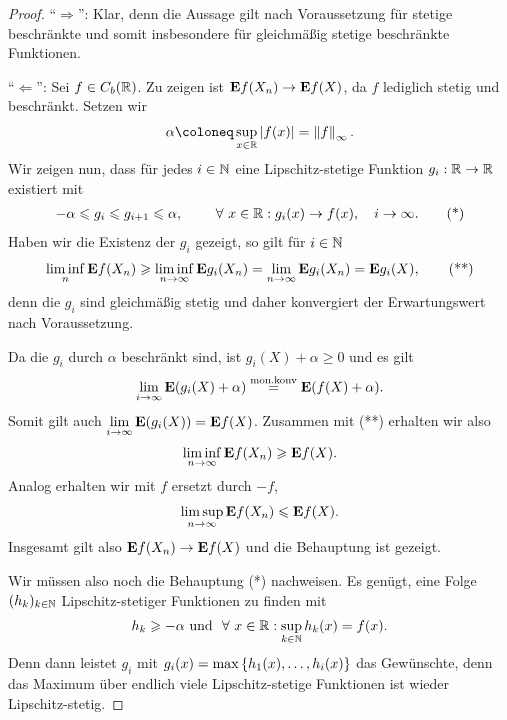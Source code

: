 \begin{proof}
``$\Rightarrow$'': Klar, denn die Aussage gilt nach Voraussetzung für stetige
beschränkte  und somit insbesondere für gleichmäßig stetige
beschränkte Funktionen.

``$\Leftarrow$'': Sei $f\in C_b(\mathbb{R})$. Zu zeigen ist $\textbf{E} f(X_n)\to \textbf{E} f(X)$, da
$f$ lediglich stetig und beschränkt. Setzen wir
\begin{align*}
\alpha \defl \sup_{x\in\R} \abs{f(x)} = \norm{f}_\infty.
\end{align*}
Wir zeigen nun, dass für jedes $i\in\mathbb{N}$ eine Lipschitz-stetige Funktion
$g_i:\mathbb{R}\to\mathbb{R}$ existiert mit
\begin{align*}
-\alpha \le g_i \le g_{i+1}\le \alpha,\qquad \forall x\in \R : g_i(x)\to
f(x),\quad i\to\infty.\tag{*}
\end{align*}
Haben wir die Existenz der $g_i$ gezeigt, so gilt für $i\in\mathbb{N}$
\begin{align*}
\liminf_n \textbf{E} f(X_n) \geqslant \liminf\limits_{n\to\infty} \textbf{E} g_i(X_n)
= \lim\limits_{n\to\infty} \textbf{E} g_i(X_n) = \textbf{E} g_i(X),\tag{**}
\end{align*}
denn die $g_i$ sind gleichmäßig stetig und daher konvergiert der Erwartungswert
nach Voraussetzung.

Da die $g_i$ durch $\alpha$ beschränkt sind, ist $g_i(X)+\alpha \ge 0$ und es
gilt
\begin{align*}
\lim\limits_{i\to\infty} \textbf{E}(g_i(X)+\alpha)
\overset{\text{mon.konv}}{=}
\textbf{E} (f(X)+\alpha).
\end{align*}
Somit gilt auch $\lim\limits_{i\to\infty} \textbf{E}(g_i(X)) = \textbf{E} f(X)$. Zusammen mit
(**) erhalten wir also
\begin{align*}
\liminf\limits_{n\to\infty} \textbf{E} f(X_n) \geqslant \textbf{E} f(X).
\end{align*}
Analog erhalten wir mit $f$ ersetzt durch $-f$,
\begin{align*}
\limsup\limits_{n\to\infty} \textbf{E} f(X_n) \leqslant \textbf{E} f(X).
\end{align*}
Insgesamt gilt also $\textbf{E} f(X_n)\to \textbf{E} f(X)$ und die Behauptung ist gezeigt.

Wir müssen also noch die Behauptung (*) nachweisen. Es genügt, eine Folge
$(h_k)_{k\in\mathbb{N}}$ Lipschitz-stetiger Funktionen zu finden mit
\begin{align*}
h_k \ge -\alpha\text{ und } \forall x\in\R : \sup_{k\in\N} h_k(x) = f(x). 
\end{align*} 
Denn dann leistet $g_i$ mit $g_i(x)=\max\left\{ h_1(x),\ldots,h_i(x) \right\}$ das
Gewünschte, denn das Maximum über endlich viele Lipschitz-stetige Funktionen
ist wieder Lipschitz-stetig.


\end{proof}
